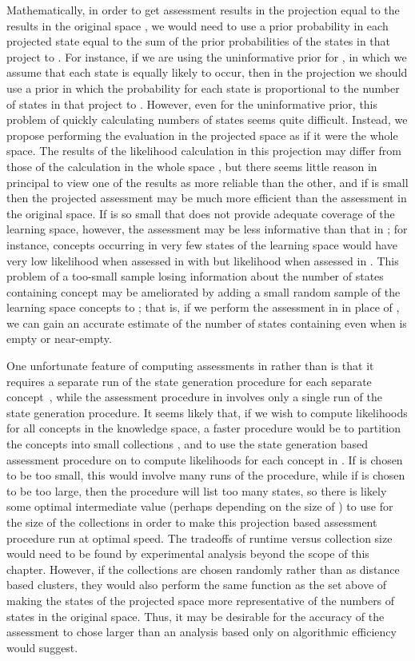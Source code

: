 \documentclass[11pt]{llncs}
\begin{document}
{Mathematically, in order to get assessment results in the projection equal to the results in the original space , we would need to use a prior probability in each projected state  equal to the sum of the prior probabilities of the states in  that project to . For instance, if we are using the uninformative prior for , in which we assume that each state is equally likely to occur, then in the projection we should use a prior in which the probability for each state  is proportional to the number of states in  that project to . However, even for the uninformative prior, this problem of quickly calculating numbers of states seems quite difficult. Instead, we propose performing the evaluation in the projected space   as if it were the whole space. The results of the likelihood calculation in this projection may differ from those of the calculation in the whole space , but there seems little reason in principal to view one of the results as more reliable than the other, and if  is small then the projected assessment may be much more efficient than the assessment in the original space. If  is so small that  does not provide adequate coverage of the learning space, however,
the assessment may be less informative than that in ; for instance, concepts occurring in very few states of the learning space would have very low likelihood when assessed in  with  but  likelihood when assessed in . This problem of a too-small sample losing information about the number of states containing concept  may be ameliorated by adding a small random sample  of the learning space concepts to ; that is, if we perform the assessment in  in place of , we can gain an accurate estimate of the number of states containing  even when  is empty or near-empty.

One unfortunate feature of computing assessments in  rather than  is that it requires a separate run of the state generation procedure for each separate concept~, while the assessment procedure in  involves only a single run of the state generation procedure. It seems likely that, if we wish to compute likelihoods for all concepts in the knowledge space,
a faster procedure would be to partition the concepts into small collections , and to use the state generation based assessment procedure on  to compute likelihoods for each concept in . If  is chosen to be too small, this would involve many runs of the procedure, while if  is chosen to be too large, then the procedure will list too many states, so there is likely some optimal intermediate value (perhaps depending on the size of ) to use for the size of the collections  in order to make this projection based assessment procedure run at optimal speed. The tradeoffs of runtime versus collection size would need to be found by experimental analysis beyond the scope of this chapter. However, if the collections  are chosen randomly rather than as distance based clusters, they would also perform the same function as the set  above of making
the states of the projected space more representative of the numbers of states in the original space. Thus, it may be desirable for the accuracy of the assessment to chose  larger than an analysis based only on algorithmic efficiency would suggest.

}
\end{document}

